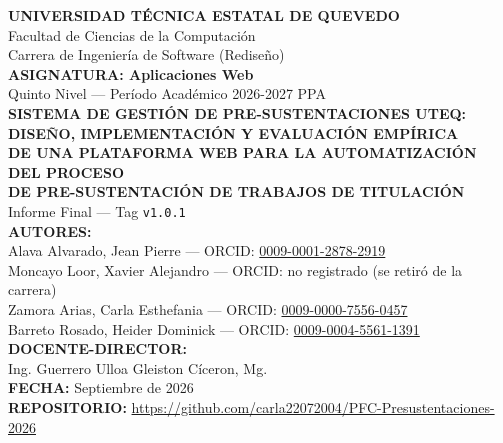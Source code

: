 \begin{titlepage}
\centering
\vspace*{1cm}
{\LARGE \textbf{UNIVERSIDAD TÉCNICA ESTATAL DE QUEVEDO}}\\[0.3cm]
{\large Facultad de Ciencias de la Computación}\\[0.2cm]
{\large Carrera de Ingeniería de Software (Rediseño)}\\[0.8cm]

{\large \textbf{ASIGNATURA: Aplicaciones Web}}\\[0.3cm]
{\large Quinto Nivel --- Período Académico 2026-2027 PPA}\\[1.2cm]

{\Large \textbf{SISTEMA DE GESTIÓN DE PRE-SUSTENTACIONES UTEQ:}}\\[0.2cm]
{\Large \textbf{DISEÑO, IMPLEMENTACIÓN Y EVALUACIÓN EMPÍRICA}}\\[0.3cm]
{\large \textbf{DE UNA PLATAFORMA WEB PARA LA AUTOMATIZACIÓN DEL PROCESO}}\\[0.1cm]
{\large \textbf{DE PRE-SUSTENTACIÓN DE TRABAJOS DE TITULACIÓN}}\\[1cm]

{\large Informe Final --- Tag \texttt{v1.0.1}}\\[1.5cm]

\vfill
{\large \textbf{AUTORES:}}\\[0.4cm]
{\large Alava Alvarado, Jean Pierre \quad --- \quad ORCID: \href{https://orcid.org/0009-0001-2878-2919}{0009-0001-2878-2919}}\\[0.15cm]
{\large Moncayo Loor, Xavier Alejandro \quad --- \quad ORCID: no registrado (se retiró de la carrera)}\\[0.15cm]
{\large Zamora Arias, Carla Esthefania \quad --- \quad ORCID: \href{https://orcid.org/0009-0000-7556-0457}{0009-0000-7556-0457}}\\[0.15cm]
{\large Barreto Rosado, Heider Dominick \quad --- \quad ORCID: \href{https://orcid.org/0009-0004-5561-1391}{0009-0004-5561-1391}}\\[1cm]

{\large \textbf{DOCENTE-DIRECTOR:}}\\[0.3cm]
{\large Ing. Guerrero Ulloa Gleiston Cíceron, Mg.}\\[1cm]

{\large \textbf{FECHA:} Septiembre de 2026}\\[0.5cm]

{\large \textbf{REPOSITORIO:} \url{https://github.com/carla22072004/PFC-Presustentaciones-2026}}\\[0.5cm]
\end{titlepage}


